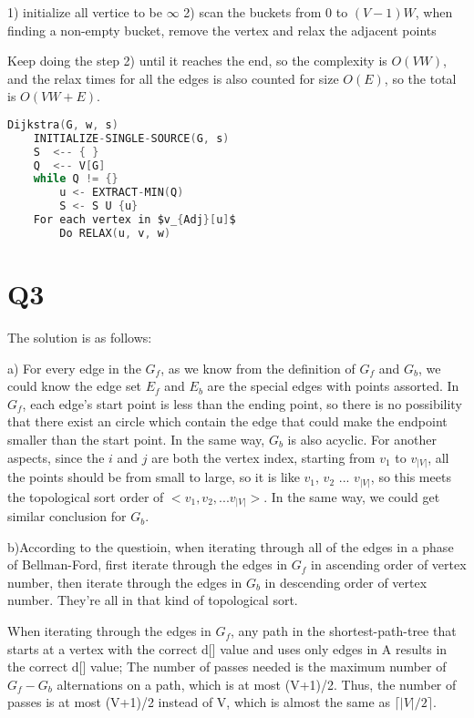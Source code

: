 \documentclass{article}
\begin{document}
1) initialize all vertice to be $\infty$
2) scan the buckets from 0 to $(V-1)W$, when finding a non-empty bucket, remove the vertex and relax the adjacent points

Keep doing the step 2) until it reaches the end, so the complexity is $O(VW)$, and the relax times for all the edges
is also counted for size $O(E)$, so the total is $O(VW+E)$.


\begin{lstlisting}[language=C]
Dijkstra(G, w, s)
	INITIALIZE-SINGLE-SOURCE(G, s)
	S  <-- { }
	Q  <-- V[G]
	while Q != {}
		u <- EXTRACT-MIN(Q)
		S <- S U {u}
	For each vertex in $v_{Adj}[u]$
		Do RELAX(u, v, w) 

\end{lstlisting}

\section{Q3}

The solution is as follows:

a) For every edge in the $G_{f}$, as we know from the definition of $G_{f}$ and $G_{b}$, we could know the edge set $E_{f}$ and $E_{b}$ are the special edges with points assorted. In $G_{f}$, each edge's start point is less than the
ending point, so there is no possibility that there exist an circle which contain the edge that 
could make the endpoint smaller than the start point. In the same way, $G_{b}$ is also acyclic. For another aspects, since the $i$ and $j$ are both the vertex index,
starting from $v_{1}$ to $v_{|V|}$, all the points should be from small to large, so it is like $v_{1}$, $v_{2}$ ... $v_{|V|}$, so this meets the topological sort order of $<v_{1}, v_{2}, ... v_{|V|}>$. In the same way, we could get similar conclusion for $G_{b}$.


b)According to the questioin, when iterating through all of the edges in a phase of Bellman-Ford, first iterate through the edges in $G_{f}$ in ascending order of vertex number, then iterate through the edges in $G_{b}$ in descending order of vertex number. They're all in that kind of topological sort.

When iterating through the edges in $G_{f}$, any path in the shortest-path-tree that starts at a vertex with the correct d[] value and uses only edges in A results in the correct d[] value; The number of passes needed is the maximum number of $G_{f}-G_{b}$ alternations on a path, which is at most (V+1)/2. Thus, the number of passes is at most (V+1)/2 instead of V, which is almost the same as $\lceil|V|/2\rceil$. %
\end{document}
